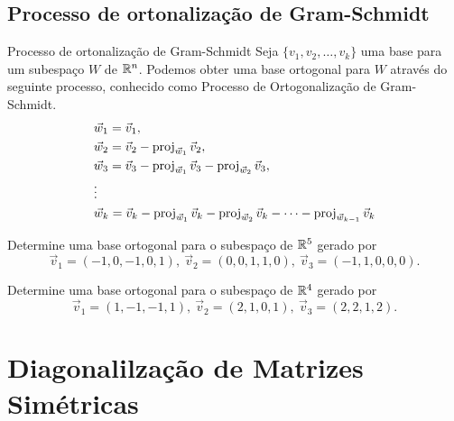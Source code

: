 \subsection*{Processo de ortonalização de Gram-Schmidt}
\begin{frame}[label=orto]{Processo de ortonalização de Gram-Schmidt}
Seja $\{v_1,v_2,\ldots, v_k \}$ uma base para um subespaço $W$ de $\mathbb{R}^n$. 
Podemos obter uma base ortogonal para $W$ através do seguinte processo, conhecido como {\color{blue}Processo de Ortogonalização de Gram-Schmidt}.
\begin{align*}
& \vec{w}_1=\vec{v}_1,\\
& \vec{w}_2=\vec{v}_2-\operatorname{proj}_{{\vec{w}_1}}\vec{v}_2,\\
& \vec{w}_3=\vec{v}_3-\operatorname{proj}_{{\vec{w}_1}}\vec{v}_3
-\operatorname{proj}_{{\vec{w}_2}}\vec{v}_3,\\
& \vdots\\
& \vec{w}_k=\vec{v}_k-\operatorname{proj}_{{\vec{w}_1}}\vec{v}_k
-\operatorname{proj}_{{\vec{w}_2}}\vec{v}_k-\cdots-\operatorname{proj}_{{\vec{w}_{k-1}}}\vec{v}_k
\end{align*}


\begin{exe}
Determine uma base ortogonal para o subespaço de $\mathbb{R}^5$ gerado por
\[\vec{v}_1=(-1,0,-1,0,1),\ \vec{v}_2=(0,0,1,1,0),\ \vec{v}_3=(-1,1,0,0,0).\]
\end{exe}

\end{frame}


\begin{frame}[label=orto]{}

\begin{casa}
Determine uma base ortogonal para o subespaço de $\mathbb{R}^4$ gerado por
\[\vec{v}_1=(1,-1,-1,1),\ \vec{v}_2=(2,1,0,1),\ \vec{v}_3=(2,2,1,2).\]
\end{casa}
\end{frame}

\section{Diagonalilzação de Matrizes Simétricas}


